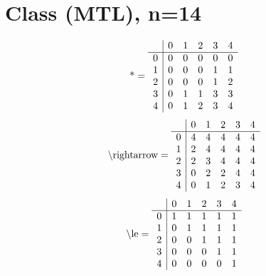 \documentclass[11pt]{article}
\begin{document}
\section{Class (MTL), n=14}
\[\text{*} = 
\begin{array}{r | r r r r r}
 & 0 & 1 & 2 & 3 & 4 \\ \hline
0 & 0 & 0 & 0 & 0 & 0 \\
1 & 0 & 0 & 0 & 1 & 1 \\
2 & 0 & 0 & 0 & 1 & 2 \\
3 & 0 & 1 & 1 & 3 & 3 \\
4 & 0 & 1 & 2 & 3 & 4 \\
\end{array}
\]
\[\text{\textbackslash rightarrow} = 
\begin{array}{r | r r r r r}
 & 0 & 1 & 2 & 3 & 4 \\ \hline
0 & 4 & 4 & 4 & 4 & 4 \\
1 & 2 & 4 & 4 & 4 & 4 \\
2 & 2 & 3 & 4 & 4 & 4 \\
3 & 0 & 2 & 2 & 4 & 4 \\
4 & 0 & 1 & 2 & 3 & 4 \\
\end{array}
\]
\[\text{\textbackslash le} = 
\begin{array}{r | r r r r r}
 & 0 & 1 & 2 & 3 & 4 \\ \hline
0 & 1 & 1 & 1 & 1 & 1 \\
1 & 0 & 1 & 1 & 1 & 1 \\
2 & 0 & 0 & 1 & 1 & 1 \\
3 & 0 & 0 & 0 & 1 & 1 \\
4 & 0 & 0 & 0 & 0 & 1 \\
\end{array}
\]
\end{document}

